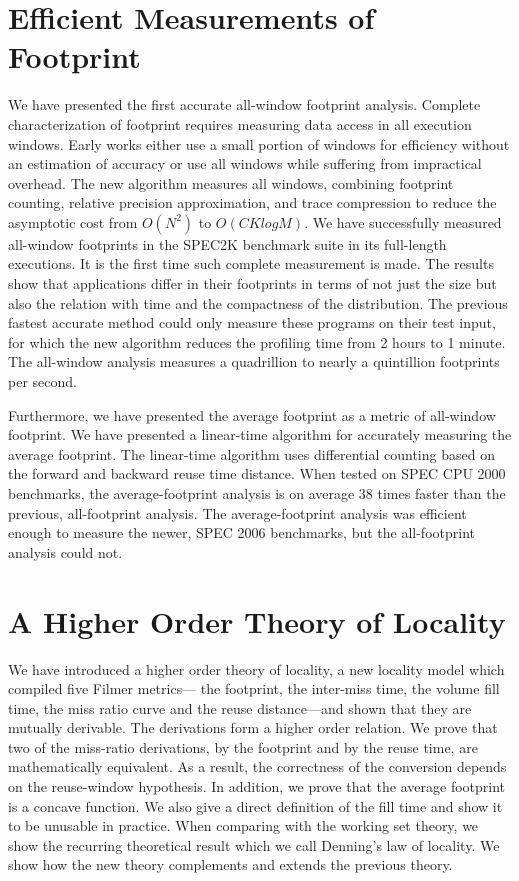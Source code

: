 \documentclass[12pt]{report}
\begin{document}
\section{Efficient Measurements of Footprint}
We have presented the first accurate all-window footprint analysis.
Complete characterization of footprint requires measuring data
access in all execution windows. Early works either use a small portion
of windows for efficiency without an estimation of accuracy or use all
windows while suffering from impractical overhead. 
The new algorithm measures all windows, combining footprint counting,
relative precision approximation, and trace compression to reduce the
asymptotic cost from $O(N^2)$ to $O(CKlogM)$.  We have successfully
measured all-window footprints in the SPEC2K benchmark suite in its
full-length executions.  It is the first time such complete
measurement is made.  The results show that applications differ in
their footprints in terms of not just the size but also the relation
with time and the compactness of the distribution.  The previous
fastest accurate method could only measure these programs on their
test input, for which the new algorithm reduces the profiling time
from 2 hours to 1 minute.  The all-window analysis measures a
quadrillion to nearly a quintillion footprints per second.

Furthermore, we have presented the average footprint as a metric of
all-window footprint. We have presented a linear-time algorithm for
accurately measuring the average footprint.  The linear-time algorithm
uses differential counting based on the forward and backward reuse
time distance. When tested on SPEC CPU 2000 benchmarks, the
average-footprint analysis is on average 38 times faster than the
previous, all-footprint analysis. The average-footprint analysis was
efficient enough to measure the newer, SPEC 2006 benchmarks, but the
all-footprint analysis could not. 

\section{A Higher Order Theory of Locality}

We have introduced a higher order theory of locality, a new locality
model which compiled five Filmer metrics--- the
footprint, the inter-miss time, the volume fill time, the miss ratio
curve and the reuse distance---and shown that they are mutually
derivable.  The derivations form a higher order relation.  We prove
that two of the miss-ratio derivations, by the footprint and by the
reuse time, are mathematically equivalent.  As a result, the
correctness of the conversion depends on the reuse-window
hypothesis.  In addition, we prove that the average footprint is a
concave function.  We also give a direct definition of the fill
time and show it to be unusable in practice.  When comparing with the
working set theory, we show the recurring theoretical result which we call
Denning's law of locality.  We show how the new theory complements and
extends the previous theory.
\end{document}
